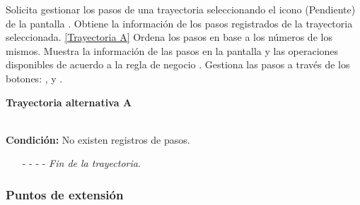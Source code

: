\begin{UCtrayectoria}
	\UCpaso[\UCactor] Solicita gestionar los pasos de una trayectoria seleccionando el icono (Pendiente) de la pantalla .
	\UCpaso[\UCsist] Obtiene la información de los pasos registrados de la trayectoria seleccionada. \hyperlink{CU12-1-1-1-1:TAA}{[Trayectoria A]}
	\UCpaso[\UCsist] Ordena los pasos en base a los números de los mismos.
	\UCpaso[\UCsist] Muestra la información de las pasos en la pantalla  y las operaciones disponibles de acuerdo a la regla de negocio . \label{CU12-1-1-1-1-P4}
	\UCpaso[\UCactor] Gestiona las pasos a través de los botones: , \editar y \eliminar. 
\end{UCtrayectoria}		
\hypertarget{CU12-1-1-1-1:TAA}{\textbf{Trayectoria alternativa A}}\\
\noindent \textbf{Condición:} No existen registros de pasos.
\begin{enumerate}
	\UCpaso[\UCsist] Muestra el mensaje  en la pantalla  para indicar que no hay registros de pasos para mostrar.  \label{CU12-1-1-1-1-TA1}
	\UCpaso[\UCactor] Gestiona las pasos a través del botón: . 
	\item[- -] - - {\em {Fin de la trayectoria}}.%
\end{enumerate}
\subsubsection{Puntos de extensión}

